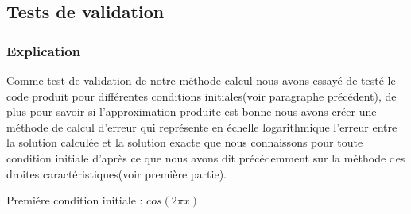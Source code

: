 \documentclass[12pt]{article}
\begin{document}
\subsection{Tests de validation}
\subsubsection{Explication}
Comme test de validation de notre méthode calcul nous avons essayé de testé le code produit pour différentes conditions initiales(voir paragraphe précédent), de plus pour savoir si l'approximation produite est bonne nous avons créer une méthode de calcul d'erreur qui représente en échelle logarithmique l'erreur entre la solution calculée et la solution exacte que nous connaissons pour toute condition initiale d'après ce que nous avons dit précédemment sur la méthode des droites caractéristiques(voir première partie).

Premiére condition initiale : $cos(2 \pi x)$
\end{document}
